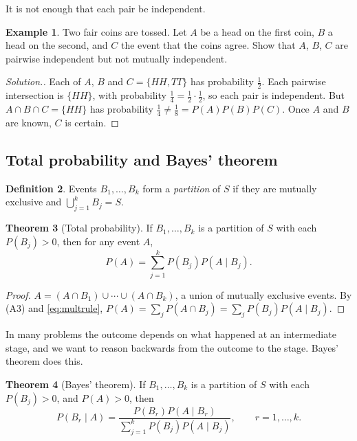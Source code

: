 \documentclass[12pt,a4paper]{report}
\theoremstyle{definition}
\newtheorem{thm}{Theorem}[section]
\newtheorem{definition}[thm]{Definition}
\newtheorem{example}[thm]{Example}
\theoremstyle{plain}
\theoremstyle{definition}
\newenvironment{solution}
  {\renewcommand{\qedsymbol}{}\begin{proof}[\textit{Solution}.]}
  {\end{proof}}
\begin{document}
It is not enough that each pair be independent.

\begin{example}
\label{ex:pairwise}
Two fair coins are tossed. Let $A$ be a head on the first coin, $B$ a head on the
second, and $C$ the event that the coins agree. Show that $A$, $B$, $C$ are pairwise
independent but not mutually independent.
\end{example}

\begin{solution}
Each of $A$, $B$ and $C = \{HH, TT\}$ has probability $\frac12$. Each pairwise intersection
is $\{HH\}$, with probability $\frac14 = \frac12\cdot\frac12$, so each pair is independent.
But $A\cap B\cap C = \{HH\}$ has probability $\frac14\ne\frac18 = P(A)P(B)P(C)$. Once $A$
and $B$ are known, $C$ is certain.
\end{solution}

\subsection{Total probability and Bayes' theorem}

\begin{definition}
\label{def:partition}
Events $B_1, \dots, B_k$ form a \emph{partition} of $S$ if they are mutually exclusive
and $\bigcup_{j=1}^kB_j = S$.
\end{definition}

\begin{thm}[Total probability]
\label{thm:totalprob}
If $B_1, \dots, B_k$ is a partition of $S$ with each $P(B_j)>0$, then for any event $A$,
\[P(A) = \sum_{j=1}^kP(B_j)P(A\mid B_j).\]
\end{thm}

\begin{proof}
$A = (A\cap B_1)\cup\cdots\cup(A\cap B_k)$, a union of mutually exclusive events. By
(A3) and \eqref{eq:multrule},
$P(A) = \sum_jP(A\cap B_j) = \sum_jP(B_j)P(A\mid B_j)$.
\end{proof}

In many problems the outcome depends on what happened at an intermediate stage, and we
want to reason backwards from the outcome to the stage. Bayes' theorem does this.

\begin{thm}[Bayes' theorem]
\label{thm:bayes}
If $B_1, \dots, B_k$ is a partition of $S$ with each $P(B_j)>0$, and $P(A)>0$, then
\[P(B_r\mid A) = \frac{P(B_r)P(A\mid B_r)}{\sum_{j=1}^kP(B_j)P(A\mid B_j)},\qquad r = 1, \dots, k .\]
\end{thm}
\end{document}
